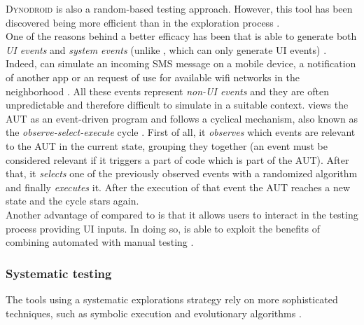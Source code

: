 \textsc{Dynodroid} \cite{dynodroid} is also a random-based testing approach. However, this tool has been discovered being more efficient than \monkey in the exploration process  \cite{areWeThereYet}. \\
One of the reasons behind a better efficacy has been that \dynodroid is able to generate both \textit{UI events} and \textit{system events} (unlike \monkey, which can only generate UI events) \cite{areWeThereYet}. \\  
Indeed, \dynodroid can simulate an incoming SMS message on a mobile device, a notification of another app or an request of use for available wifi networks in the neighborhood \cite{dynodroid}. All these events represent \textit{non-UI events} and they are often unpredictable and therefore difficult to simulate in a suitable context. 
\dynodroid views the AUT as an event-driven program and follows a cyclical mechanism, also known as the \textit{observe-select-execute} cycle \cite{dynodroid}. First of all, it \textit{observes} which events are relevant to the AUT in the current state, grouping they together (an event must be considered relevant if it triggers a part of code which is part of the AUT). After that, it \textit{selects} one of the previously observed events with a randomized algorithm \cite{dynodroid, areWeThereYet} and finally \textit{executes} it. After the execution of that event the AUT reaches a new state and the cycle stars again. \\
Another advantage of \dynodroid compared to \monkey is that it allows users to interact in the testing process providing UI inputs. In doing so, \dynodroid is able to exploit the benefits of combining automated with manual testing \cite{dynodroid}.

\subsubsection{Systematic testing}
The tools using a systematic explorations strategy rely on more sophisticated techniques, such as symbolic execution and evolutionary algorithms \cite{areWeThereYet}. 


